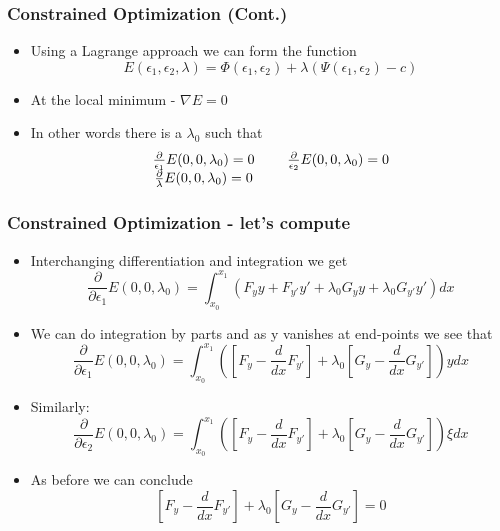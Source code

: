 \documentclass[10pt]{beamer}
\begin{document}
\begin{frame}
  \frametitle{Constrained Optimization (Cont.)}
  \begin{itemize}
  \item Using a Lagrange approach we can form the function
    \[
      E(\epsilon_1, \epsilon_2, \lambda) =
      \Phi( \epsilon_1, \epsilon_2 ) + \lambda (\Psi(\epsilon_1, \epsilon_2 ) - c)
    \]
    
  \item At the local minimum - $\nabla E = 0$
  \item In other words there is a $\lambda_0$ such that
    \[
      \begin{array}[c]{ccc}
        \frac{\partial}{\epsilon_1} E(0,0,\lambda_0) = 0  & \mbox{~~  ~~}&
        \frac{\partial}{\epsilon_2} E(0,0,\lambda_0) = 0  \\
        \frac{\partial}{\lambda} E(0,0,\lambda_0) = 0 && \\        
      \end{array}
    \]
  \end{itemize}
\end{frame}

\begin{frame}
  \frametitle{Constrained Optimization - let's compute}
  \begin{itemize}
  \item Interchanging differentiation and integration we get
    \[
      \frac{\partial }{\partial \epsilon_1} E(0,0,\lambda_0) =
      \int_{x_0}^{x_1} \left( F_y y + F_{y'} y' +
        \lambda_0 G_y y + \lambda_0 G_{y'} y' \right) dx
    \]
    \pause
  \item We can do integration by parts and as y vanishes at end-points we see that
    \[
      \frac{\partial }{\partial \epsilon_1} E(0,0,\lambda_0) =
      \int_{x_0}^{x_1} \left( \left[ F_y - \frac{d}{dx} F_{y'} \right]
        + \lambda_0 \left[ G_y - \frac{d}{dx} G_{y'} \right] \right)
      y dx
    \]
    \pause
  \item Similarly:
    \[
      \frac{\partial }{\partial \epsilon_2} E(0,0,\lambda_0) =
      \int_{x_0}^{x_1} \left( \left[ F_y - \frac{d}{dx} F_{y'} \right]
        + \lambda_0 \left[ G_y - \frac{d}{dx} G_{y'} \right] \right)
      \xi dx
    \]
    \pause
  \item As before we can conclude
    \[
      \left[ F_y - \frac{d}{dx} F_{y'} \right]
      + \lambda_0 \left[ G_y - \frac{d}{dx} G_{y'} \right] = 0
    \]
  \end{itemize}
\end{frame}
\end{document}
